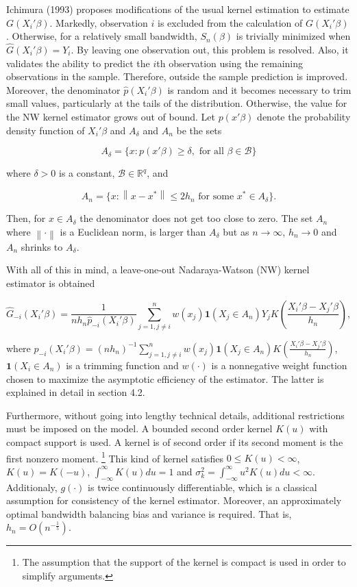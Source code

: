 \documentclass[a4paper]{article}
\newcommand{\norm}[1]{\left\lVert#1\right\rVert}
\begin{document}
Ichimura (1993) \cite{[6]} proposes modifications of the usual kernel estimation to estimate $G(X_i'\beta)$. Markedly, observation $i$ is excluded from the calculation of $G(X_i'\beta)$. Otherwise, for a relatively small bandwidth, $S_n(\beta)$ is trivially minimized when $\hat{G}(X_i'\beta) = Y_i$. By leaving one observation out, this problem is resolved. Also, it validates the ability to predict the $i$th observation using the remaining observations in the sample. Therefore, outside the sample prediction is improved. Moreover, the denominator $\hat{p}(X_i'\beta)$ is random and it becomes necessary to trim small values, particularly at the tails of the distribution. Otherwise, the value for the NW kernel estimator grows out of bound. Let $p(x'\beta)$ denote the probability density function of $X_i'\beta$ and $A_\delta$ and $A_n$ be the sets

\[ A_\delta = \{ x : p(x'\beta) \geq \delta, \text{ for all }  \beta \in \mathcal{B} \}
\]

where $\delta > 0$ is a constant, $\mathcal{B} \in \mathbb{R}^q$, and

\[ A_n = \{ x : \norm{x - x^*} \leq 2h_n \text{ for some } x^* \in A_\delta\}.
\]

Then, for $x \in A_\delta$ the denominator does not get too close to zero. The set $A_n$ where $\norm{\cdot}$ is a Euclidean norm, is larger than $A_\delta$ but as $ n \rightarrow \infty $, $h_n \rightarrow 0$ and $A_n$ shrinks to $A_\delta$. 

With all of this in mind, a leave-one-out Nadaraya-Watson (NW) kernel estimator is obtained

\begin{equation}
\hat{G}_{-i}(X_i'\beta) = \frac{1}{nh_n\hat{p}_{-i}(X_i'\beta)}\sum_{j=1, j \neq i }^{n}  w(x_j)\mathbf{1}{(X_j \in A_n)}Y_jK\left(\frac{X_i'\beta - X_j'\beta}{h_n}\right),
\end{equation}

where $\hat{p}_{-i}(X_i'\beta) = (nh_n)^{-1}\sum_{j=1,j \neq i}^{n}w(x_j)\mathbf{1}{(X_j \in A_n)}K\left(\frac{X_i'\beta - X_j'\beta}{h_n}\right)$, \linebreak  $\mathbf{1}{(X_i \in A_n)}$ is a trimming function and $w(\cdot)$ is a nonnegative weight function chosen to maximize the asymptotic efficiency of the estimator. The latter is explained in detail in section 4.2.


Furthermore, without going into lengthy technical details, additional restrictions must be imposed on the model. A bounded second order kernel $K(u)$ with compact support is used. A kernel is of second order if its second moment is the first nonzero moment. \footnote{The assumption that the support of the kernel is compact is used in order to simplify arguments.} This kind of kernel satisfies $0 \leq K(u) < \infty$, $K(u)=K(-u)$, $\int_{- \infty}^{\infty} K(u)du = 1$ and $\sigma_k^2 = \int_{-\infty}^{\infty} u^2K(u)du < \infty$. Additionaly, $g(\cdot)$ is twice continuously differentiable, which is a classical assumption for consistency of the kernel estimator. Moreover, an approximately optimal bandwidth balancing bias and variance is required. That is, $ h_n = O(n^{-\frac{1}{5}})$.
\end{document}
